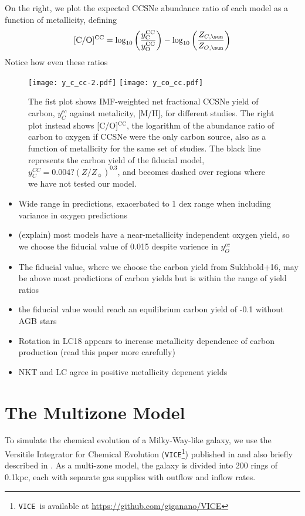 \documentclass[fleqn,usenatbib]{mnras}
\newcommand{\VICE}{\texttt{VICE}}
\begin{document}
On the right, we plot the expected CCSNe abundance ratio of each model as a function of metallicity, defining
\begin{equation}
    {\rm [C/O]^{CC}} = \log_{10}\left( \frac{y_{\rm C}^{\rm CC}}{y_{\rm O}^{\rm CC}}\right) - \log_{10} \left( \frac{Z_{C, \sun }}{Z_{O, \sun }} \right)
\end{equation}
Notice how even these ratios 
\begin{figure}
    \texttt{[image: y\_c\_cc-2.pdf]}
    \texttt{[image: y\_co\_cc.pdf]}
    \caption{The fist plot shows IMF-weighted net fractional CCSNe yield of carbon, $y_C^{cc}$ against metalicity, [M/H], for different studies. The right plot instead shows [C/O]$^\text{CC}$, the logarithm of the abundance ratio of carbon to oxygen if CCSNe were the only carbon source, also as a function of metallicity for the same set of studies. The black line represents the carbon yield of the fiducial model, $y_C^{CC} = 0.004? (Z/Z_{\sun})^{0.3}$, and becomes dashed over regions where we have not tested our model. }
    \label{fig:y_cc}
\end{figure}

    \begin{itemize}
        \item Wide range in predictions, exacerbated to 1 dex range when including variance in oxygen predictions
        \item (explain) most models have a near-metallicity independent oxygen yield, so we choose the fiducial value of 0.015 despite varience in $y_O^{cc}$
        \item The fiducial value, where we choose the carbon yield from Sukhbold+16, may be above most predictions of carbon yields but is within the range of yield ratios
        \item the fiducial value would reach an equilibrium carbon yield of -0.1 without AGB stars
        \item Rotation in LC18 appears to increase metallicity dependence of carbon production (read this paper more carefully)
        \item NKT and LC agree in positive metallicity depenent yields
    \end{itemize}
    

\section{The Multizone Model}

To simulate the chemical evolution of a Milky-Way-like galaxy, we use the Versitile Integrator for Chemical Evolution (\VICE\footnote{\VICE~is available at \url{https://github.com/giganano/VICE}}) published in \citet{james+21} and also briefly described in \citet{james+22}.  As a multi-zone model, the galaxy is divided into 200 rings of 0.1kpc, each with separate gas supplies with outflow and inflow rates. 
\end{document}
